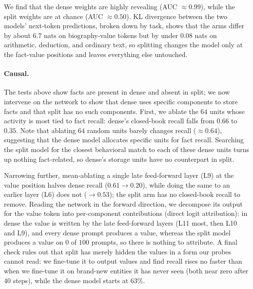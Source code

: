 \documentclass{article}
\begin{document}
We find that the dense weights are highly revealing (AUC $\approx0.99$), while the split weights are at chance (AUC $\approx0.50$). KL divergence between the two models' next-token predictions, broken down by task, shows that the arms differ by about $6.7$ nats on biography-value tokens but by under $0.08$ nats on arithmetic, deduction, and ordinary text, so splitting changes the model only at the fact-value positions and leaves everything else untouched.

\paragraph{Causal.} The tests above show facts are present in dense and absent in split; we now intervene on the network to show that dense uses specific components to store facts and that split has no such components. First, we ablate the $64$ units whose activity is most tied to fact recall: dense's closed-book recall falls from $0.66$ to $0.35$. Note that ablating $64$ random units barely changes recall ($\approx 0.64$), suggesting that the dense model allocates specific units for fact recall. Searching the split model for the closest behavioral match to each of these dense units turns up nothing fact-related, so dense's storage units have no counterpart in split. 

Narrowing further, mean-ablating a single late feed-forward layer (L9) at the value position halves dense recall ($0.61\!\to\!0.20$), while doing the same to an earlier layer (L6) does not ($\to\!0.53$); the split arm has no closed-book recall to remove. Reading the network in the forward direction, we decompose its output for the value token into per-component contributions (direct logit attribution): in dense the value is written by the late feed-forward layers (L11 most, then L10 and L9), and every dense prompt produces a value, whereas the split model produces a value on $0$ of $100$ prompts, so there is nothing to attribute. A final check rules out that split has merely hidden the values in a form our probes cannot read: we fine-tune it to output values and find recall rises no faster than when we fine-tune it on brand-new entities it has never seen (both near zero after $40$ steps), while the dense model starts at $63\%$. 
\end{document}
